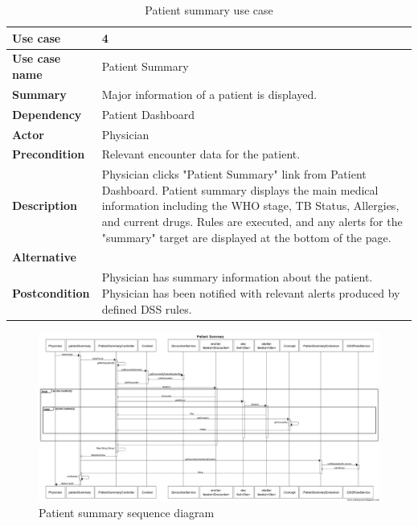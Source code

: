 \documentclass[12pt,letterpaper]{article}
\begin{document}
\begin{table}
\begin{centering}
\begin{tabular}{ |  >{\bfseries}l | p{5in} |} \hline
Use case &
4 \\ \hline
Use case name &
Patient Summary \\ \hline
Summary & 
Major information of a patient is displayed. \\ \hline
Dependency &
Patient Dashboard \\ \hline
Actor &
Physician \\ \hline
Precondition &
Relevant encounter data for the patient. \\ \hline
Description &
Physician clicks "Patient Summary" link from Patient Dashboard. \newline
Patient summary displays the main medical information including the WHO stage, TB Status, Allergies, and current drugs. \newline
Rules are executed, and any alerts for the "summary" target are 
displayed at the bottom of the page.
\\ \hline
Alternative &
\\ \hline
Postcondition &
Physician has summary information about the patient. \newline
Physician has been notified with relevant alerts produced by defined 
DSS rules.
\\ \hline
\end{tabular}
\end{centering}
\caption{Patient summary use case} \label{tab:PATIENT_SUMMARY_USE_CASE}
\end{table}

\begin{figure}\begin{center}
\includegraphics[width=8in]{sequence/patient_summary.png}
\end{center}
\caption{Patient summary sequence diagram} 
\label{fig:PATIENT_SUMMARY_SEQUENCE}
\end{figure}
\end{document}
